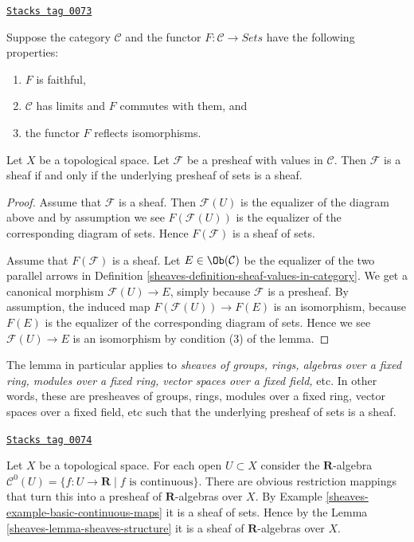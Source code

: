 \begin{lemma}
\label{sheaves-lemma-sheaves-structure}
\href{https://stacks.math.columbia.edu/tag/0073}{\texttt{Stacks tag 0073}}

Suppose the category $\mathcal{C}$ and
the functor $F : \mathcal{C} \to \textit{Sets}$
have the following properties:
\begin{enumerate}
\item $F$ is faithful,
\item $\mathcal{C}$ has limits and $F$ commutes with them, and
\item the functor $F$ reflects isomorphisms.
\end{enumerate}
Let $X$ be a topological space. Let $\mathcal{F}$
be a presheaf with values in $\mathcal{C}$.
Then $\mathcal{F}$ is a sheaf if and only if the
underlying presheaf of sets is a sheaf.
\end{lemma}

\begin{proof}

Assume that $\mathcal{F}$ is a sheaf. Then
$\mathcal{F}(U)$ is the equalizer of the diagram
above and by assumption we see $F(\mathcal{F}(U))$
is the equalizer of the corresponding diagram
of sets. Hence $F(\mathcal{F})$ is a sheaf of sets.

\medskip\noindent
Assume that $F(\mathcal{F})$ is a sheaf.
Let $E \in \Ob(\mathcal{C})$ be the
equalizer of the two parallel arrows in
Definition \ref{sheaves-definition-sheaf-values-in-category}.
We get a canonical morphism $\mathcal{F}(U) \to E$,
simply because $\mathcal{F}$ is a presheaf.
By assumption, the induced map $F(\mathcal{F}(U)) \to F(E)$
is an isomorphism, because $F(E)$ is the equalizer
of the corresponding diagram of sets. Hence we
see $\mathcal{F}(U) \to E$ is an isomorphism
by condition (3) of the lemma.
\end{proof}

The lemma in particular applies to
{\it sheaves of groups, rings, algebras over a fixed ring, modules
over a fixed ring, vector spaces over a fixed field, } etc.
In other words, these are presheaves of groups, rings,
modules over a fixed ring, vector spaces over a fixed field, etc
such that the underlying presheaf of sets is a sheaf.

\begin{example}
\label{sheaves-example-C0-sheaf-rings}
\href{https://stacks.math.columbia.edu/tag/0074}{\texttt{Stacks tag 0074}}

Let $X$ be a topological space. For each open $U \subset X$ consider
the $\mathbf{R}$-algebra
$\mathcal{C}^{0}(U) = \{ f : U \to \mathbf{R} \mid f\text{ is continuous}\}$.
There are obvious restriction mappings that turn this into a
presheaf of $\mathbf{R}$-algebras over $X$.
By Example \ref{sheaves-example-basic-continuous-maps} it is a sheaf of sets.
Hence by the Lemma \ref{sheaves-lemma-sheaves-structure} it is a sheaf of
$\mathbf{R}$-algebras over $X$.
\end{example}

